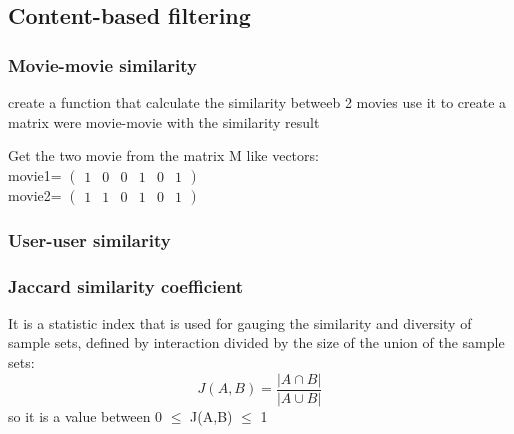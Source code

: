 \documentclass{article}
\begin{document}
\subsection{Content-based filtering}

\subsubsection{Movie-movie similarity}
create a function that calculate the similarity betweeb 2 movies 
use it to create a matrix were movie-movie with the similarity result

Get the two movie from the matrix M like vectors:\\
movie1= $\begin{pmatrix}
      1&0&0&1&0&1
\end{pmatrix}$\\
movie2= $\begin{pmatrix}
      1&1&0&1&0&1
\end{pmatrix}$
\subsubsection{User-user similarity}
\subsubsection{Jaccard similarity coefficient}
It is a statistic index that is used for gauging the similarity and diversity of sample sets, defined by interaction divided by the size of the union of the sample sets:
\begin{equation}
      J(A,B) = \dfrac{|A\cap B|}{|A\cup B|}
\end{equation}
so it is a value between 0 $\leq$ J(A,B) $\leq$ 1
\end{document}
